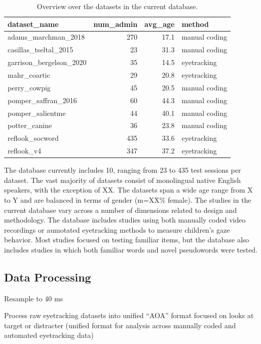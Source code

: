 \documentclass[10pt, letterpaper]{article}
\begin{document}
\begin{table}[H]
\centering
\begingroup\fontsize{9pt}{10pt}\selectfont
\begin{tabular}{lrrl}
  \hline
dataset\_name & num\_admin & avg\_age & method \\ 
  \hline
adams\_marchman\_2018 & 270 & 17.1 & manual coding \\ 
  casillas\_tseltal\_2015 & 23 & 31.3 & manual coding \\ 
  garrison\_bergelson\_2020 & 35 & 14.5 & eyetracking \\ 
  mahr\_coartic & 29 & 20.8 & eyetracking \\ 
  perry\_cowpig & 45 & 20.5 & manual coding \\ 
  pomper\_saffran\_2016 & 60 & 44.3 & manual coding \\ 
  pomper\_salientme & 44 & 40.1 & manual coding \\ 
  potter\_canine & 36 & 23.8 & manual coding \\ 
  reflook\_socword & 435 & 33.6 & eyetracking \\ 
  reflook\_v4 & 347 & 37.2 & eyetracking \\ 
   \hline
\end{tabular}
\endgroup
\caption{Overview over the datasets in the current database.} 
\end{table}

The database currently includes 10, ranging from 23 to 435 test sessions
per dataset. The vast majority of datasets consist of monolingual native
English speakers, with the exception of XX. The datasets span a wide age
range from X to Y and are balanced in terms of gender (m=XX\% female).
The studies in the current database vary across a number of dimensions
related to design and methodology. The database includes studies using
both manually coded video recordings or aumotated eyetracking methods to
measure children's gaze behavior. Most studies focused on testing
familiar items, but the database also includes studies in which both
familiar words and novel pseudowords were tested.

\hypertarget{data-processing}{%
\subsection{Data Processing}\label{data-processing}}

Resample to 40 ms

Process raw eyetracking datasets into unified ``AOA'' format focused on
looks at target or distracter (unified format for analysis across
manually coded and automated eyetracking data)
\end{document}
